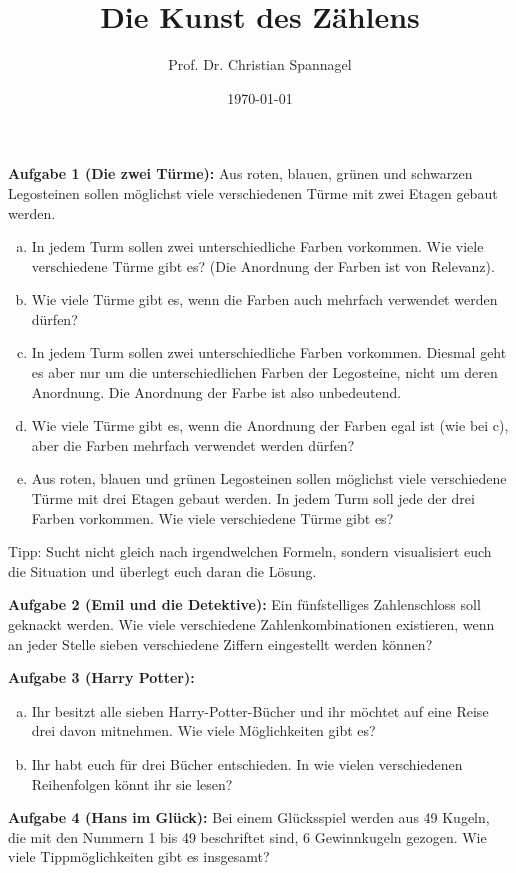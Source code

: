 \documentclass{../cssheet}
\title{Die Kunst des Zählens}
\author{Prof. Dr. Christian Spannagel}
\date{\today}
\begin{document}
\printtitle

\vspace*{10mm}

\textbf{Aufgabe 1 (Die zwei Türme):}  Aus roten, blauen, grünen und schwarzen Legosteinen sollen möglichst viele verschiedenen Türme mit zwei Etagen gebaut werden.
\begin{enumerate}[a)]
\item In jedem Turm sollen zwei unterschiedliche Farben vorkommen. Wie viele verschiedene Türme gibt es? (Die Anordnung der Farben ist von Relevanz).
\item Wie viele Türme gibt es, wenn die Farben auch mehrfach verwendet werden dürfen?
\item In jedem Turm sollen zwei unterschiedliche Farben vorkommen. Diesmal geht es aber nur um die unterschiedlichen Farben der Legosteine, nicht um deren Anordnung. Die Anordnung der Farbe ist also unbedeutend.
\item Wie viele Türme gibt es, wenn die Anordnung der Farben egal ist (wie bei c), aber die Farben mehrfach verwendet werden dürfen? 
\item Aus roten, blauen und grünen Legosteinen sollen möglichst viele verschiedene Türme mit drei Etagen gebaut werden. In jedem Turm soll jede der drei Farben vorkommen. Wie viele verschiedene Türme gibt es?
\end{enumerate}
Tipp: Sucht nicht gleich nach irgendwelchen Formeln, sondern visualisiert euch die Situation und überlegt euch daran die Lösung.


\textbf{Aufgabe 2 (Emil und die Detektive):} Ein fünfstelliges Zahlenschloss soll geknackt werden. Wie viele verschiedene Zahlenkombinationen existieren, wenn an jeder Stelle sieben verschiedene Ziffern eingestellt werden können? 


\textbf{Aufgabe 3 (Harry Potter):} 
\begin{enumerate}[a)]
\item Ihr besitzt alle sieben Harry-Potter-Bücher und ihr möchtet auf eine Reise drei davon mitnehmen. Wie viele Möglichkeiten gibt es?
\item Ihr habt euch für drei Bücher entschieden. In wie vielen verschiedenen Reihenfolgen könnt ihr sie lesen?
\end{enumerate}


\textbf{Aufgabe 4 (Hans im Glück):} Bei einem Glücksspiel werden aus 49 Kugeln, die mit den Nummern 1 bis 49 beschriftet sind, 6 Gewinnkugeln gezogen. Wie viele Tippmöglichkeiten gibt es insgesamt? 
\end{document}
